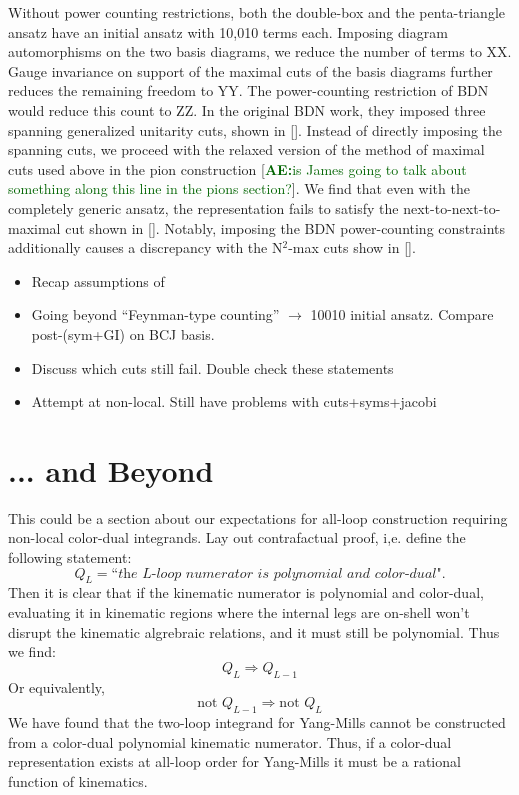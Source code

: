 \documentclass[11pt,letter]{article}
\newcommand{\ace}[1]{\textcolor{darkgreen}{\textbf{AE:}{#1}}}
\def\be{\begin{equation}}
\def\ee{\end{equation}}
\begin{document}
Without power counting restrictions, both the double-box and the
penta-triangle ansatz have an initial ansatz with 10,010 terms each.
Imposing diagram automorphisms on the two basis diagrams, we reduce
the number of terms to XX.  Gauge invariance on support of the maximal
cuts of the basis diagrams further reduces the remaining freedom to
YY.  The power-counting restriction of BDN would reduce this count to
ZZ.  In the original BDN work, they imposed three spanning generalized
unitarity cuts, shown in [].  Instead of directly imposing the
spanning cuts, we proceed with the relaxed version of the method of
maximal cuts used above in the pion construction [\ace{is James going
  to talk about something along this line in the pions section?}].  We
find that even with the completely generic ansatz, the representation
fails to satisfy the next-to-next-to-maximal cut shown in [].
Notably, imposing the BDN power-counting constraints additionally
causes a discrepancy with the N$^2$-max cuts show in [].



\begin{itemize}
\item Recap assumptions of \cite{Bern:2015ooa}
\item Going beyond ``Feynman-type counting'' $\to$ 10010 initial
  ansatz.  Compare post-(sym+GI) on BCJ basis.
\item Discuss which cuts still fail.  Double check these statements
  \item Attempt at non-local.  Still have problems with cuts+syms+jacobi
  \end{itemize}

\section{... and Beyond}
This could be a section about our expectations for all-loop construction requiring non-local color-dual integrands. Lay out contrafactual proof, i,e. define the following statement:
\be
 Q_L=\textit{``the $L$-loop numerator is polynomial and color-dual"}. 
\ee
Then it is clear that if the kinematic numerator is polynomial and color-dual, evaluating it in kinematic regions where the internal legs are on-shell won't disrupt the kinematic algrebraic relations, and it must still be polynomial. Thus we find:
\be
Q_L \Rightarrow Q_{L-1}
\ee
Or equivalently,
\be
\text{not }Q_{L-1}\Rightarrow \text{not }Q_L
\ee
We have found that the two-loop integrand for Yang-Mills cannot be constructed from a color-dual polynomial kinematic numerator. Thus, if a color-dual representation exists at all-loop order for Yang-Mills it must be a rational function of kinematics. 
  
\end{document}
